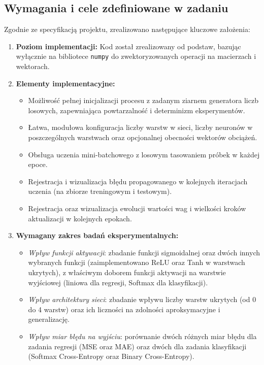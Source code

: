 \documentclass[11pt,a4paper]{article}
\begin{document}
\subsection{Wymagania i cele zdefiniowane w zadaniu}
Zgodnie ze specyfikacją projektu, zrealizowano następujące kluczowe założenia:
\begin{enumerate}
    \item \textbf{Poziom implementacji:} 
    Kod został zrealizowany od podstaw, bazując wyłącznie na bibliotece \texttt{numpy} do zwektoryzowanych operacji na macierzach i wektorach.
    
    \item \textbf{Elementy implementacyjne:}
    \begin{itemize}
        \item Możliwość pełnej inicjalizacji procesu z zadanym ziarnem generatora liczb losowych, zapewniająca powtarzalność i determinizm eksperymentów.
        \item Łatwa, modułowa konfiguracja liczby warstw w sieci, liczby neuronów w poszczególnych warstwach oraz opcjonalnej obecności wektorów obciążeń.
        \item Obsługa uczenia mini-batchowego z losowym tasowaniem próbek w każdej epoce.
        \item Rejestracja i wizualizacja błędu propagowanego w kolejnych iteracjach uczenia (na zbiorze treningowym i testowym).
        \item Rejestracja oraz wizualizacja ewolucji wartości wag i wielkości kroków aktualizacji w kolejnych epokach.
    \end{itemize}

    \item \textbf{Wymagany zakres badań eksperymentalnych:}
    \begin{itemize}
        \item \emph{Wpływ funkcji aktywacji}: zbadanie funkcji sigmoidalnej oraz dwóch innych wybranych funkcji (zaimplementowano ReLU oraz Tanh w warstwach ukrytych), z właściwym doborem funkcji aktywacji na warstwie wyjściowej (liniowa dla regresji, Softmax dla klasyfikacji).
        \item \emph{Wpływ architektury sieci}: zbadanie wpływu liczby warstw ukrytych (od 0 do 4 warstw) oraz ich liczności na zdolności aproksymacyjne i generalizację.
        \item \emph{Wpływ miar błędu na wyjściu}: porównanie dwóch różnych miar błędu dla zadania regresji (MSE oraz MAE) oraz dwóch dla zadania klasyfikacji (Softmax Cross-Entropy oraz Binary Cross-Entropy).
    \end{itemize}
\end{enumerate}
\end{document}
